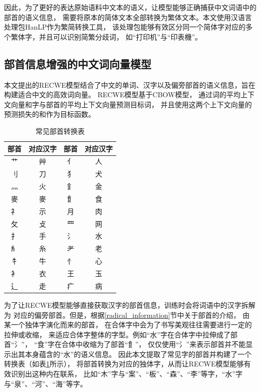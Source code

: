 因此，为了更好的表达原始语料中文本的语义，让模型能够正确捕获中文词语中的部首的语义信息，
需要将原本的简体文本全部转换为繁体文本。本文使用汉语言处理包HanLP作为繁简转换工具，
该处理包能够有效区分同一个简体字对应的多个繁体字，并且可以识别简繁分歧词，
如“打印机”与“印表機”。


\subsection{部首信息增强的中文词向量模型}
\label{recwe_section}
本文提出的RECWE模型结合了中文的单词、汉字以及偏旁部首的语义信息，旨在构建适合中文的高效词向量。
RECWE模型基于CBOW模型，
通过词的平均上下文向量和字与部首的平均上下文向量预测目标词，
并且使用这两个上下文向量的预测损失的和作为目标函数。
\begin{table}[h]
    \caption{常见部首转换表}
    \begin{tabular}{|c|c|c|c|}
        \hline
        部首 & 对应汉字 & 部首 & 对应汉字 \\
        \hline
        艹 & 艸 & 亻 & 人\\
        \hline
        刂 & 刀 & 犭 & 犬\\
        \hline
        灬 & 火 & 釒 & 金\\
        \hline
        麥 & 麥 & 飠 & 食\\
        \hline
        礻 & 示 & 月 & 肉\\
        \hline
        攵 & 攴 & 罒 & 网\\
        \hline
        扌 & 手 & 氵 & 水\\
        \hline
        糹 & 糸 & 耂 & 老\\
        \hline
        牜 & 牛 & 忄 & 心\\
        \hline
        衤 & 衣 & 王 & 玉\\
        \hline
        辶 & 走 & 疒 & 病\\
        \hline
    \end{tabular}
    \label{char_tran_form}
    \end{table}

为了让RECWE模型能够直接获取汉字的部首信息，训练时会将词语中的汉字拆解为
对应的偏旁部首。但是，根据\ref{radical_information}节中关于部首的介绍，
由某一个独体字演化而来的部首，
在合体字中会为了书写美观往往需要进行一定的拉伸或收缩，
来适应合体字整体的字型。例如“水”字在合体字中拉伸成了部首“氵”，
“食”字在合体中收缩为了部首“飠”，
仅仅使用“氵”来表示部首并不能显示出其本身蕴含的“水”的语义信息。
因此本文提取了常见字的部首并构建了一个转换表（如表\ref{char_tran_form}所示），
将部首转换为对应的独体字，从而让RECWE模型能够有效识别出这种内在联系，
比如“木”字与“案”、“板”、“森”、“李”等字，“水”字与“泉”、“河”、“海”等字。

